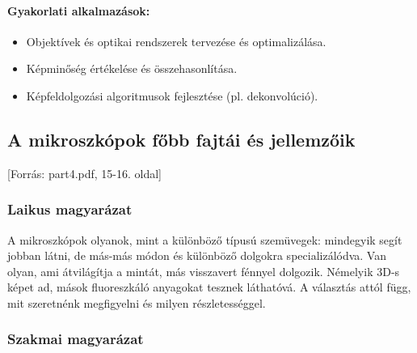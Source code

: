 \documentclass[a4paper,12pt]{article}
\begin{document}
\paragraph{Gyakorlati alkalmazások:} 
\begin{itemize}
    \item Objektívek és optikai rendszerek tervezése és optimalizálása.
    \item Képminőség értékelése és összehasonlítása.
    \item Képfeldolgozási algoritmusok fejlesztése (pl. dekonvolúció).
\end{itemize}

\subsection{A mikroszkópok főbb fajtái és jellemzőik} [Forrás: part4.pdf, 15-16. oldal]

\subsubsection{Laikus magyarázat} A mikroszkópok olyanok, mint a különböző típusú szemüvegek: mindegyik segít jobban látni, de más-más módon és különböző dolgokra specializálódva. Van olyan, ami átvilágítja a mintát, más visszavert fénnyel dolgozik. Némelyik 3D-s képet ad, mások fluoreszkáló anyagokat tesznek láthatóvá. A választás attól függ, mit szeretnénk megfigyelni és milyen részletességgel.

\subsubsection{Szakmai magyarázat}
\end{document}
